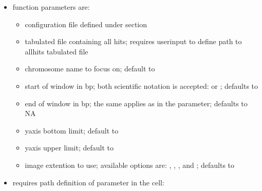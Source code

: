 \documentclass[letterpaper,10pt,english]{sphinxhowto}
\begin{document}
\begin{sphinxVerbatim}[commandchars=\\\{\}]
 \PYG{p}{[} \PYG{p}{]}            
\end{sphinxVerbatim}
\begin{itemize}
\item {} 
\sphinxAtStartPar
function parameters are:
\begin{itemize}
\item {} 
\sphinxAtStartPar
{} \sphinxhyphen{} configuration file defined under  section

\item {} 
\sphinxAtStartPar
{} \sphinxhyphen{}  tabulated file containing all hits; requires user\sphinxhyphen{}input to define path to all\sphinxhyphen{}hits tabulated file

\item {} 
\sphinxAtStartPar
{} \sphinxhyphen{} chromosome name to focus on; default to 

\item {} 
\sphinxAtStartPar
{} \sphinxhyphen{} start of window in bp; both scientific notation is accepted:  or ; defaults to 

\item {} 
\sphinxAtStartPar
{} \sphinxhyphen{} end of window in bp; the same applies as in the  parameter; defaults to NA

\item {} 
\sphinxAtStartPar
{} \sphinxhyphen{} y\sphinxhyphen{}axis bottom limit; default to 

\item {} 
\sphinxAtStartPar
{} \sphinxhyphen{} y\sphinxhyphen{}axis upper limit; default to 

\item {} 
\sphinxAtStartPar
{} \sphinxhyphen{}  image extention to use; available options are: , , , and ; defaults to 

\end{itemize}

\item {} 
\sphinxAtStartPar
requires path definition of  parameter in the cell:

\end{itemize}
\end{document}
